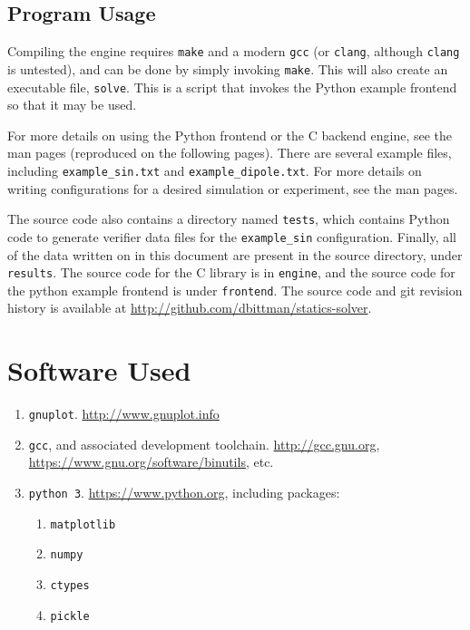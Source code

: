 \documentclass[12pt]{article}
\begin{document}
\clearpage
\begin{appendices}
\section{Program Usage}

	Compiling the engine requires \texttt{make} and a modern \texttt{gcc} (or \texttt{clang}, although \texttt{clang} is untested), and can
be done by simply invoking \texttt{make}. This will also create an executable file, \texttt{solve}. This
is a script that invokes the Python example frontend so that it may be used.

For more details on using the Python frontend or the C backend engine, see the man pages (reproduced on the
following pages). There are several example files, including \texttt{example\_sin.txt} and \texttt{example\_dipole.txt}.
For more details on writing configurations for a desired simulation or experiment, see the man pages.

The source code also contains a directory named \texttt{tests}, which contains Python code to generate verifier data
files for the \texttt{example\_sin} configuration. Finally, all of the data written on in this document are present
in the source directory, under \texttt{results}. The source code for the C library is in \texttt{engine}, and the
source code for the python example frontend is under \texttt{frontend}. The source code and git revision history
is available at \url{http://github.com/dbittman/statics-solver}.

	\begin{singlespacing}


\restoregeometry
	\end{singlespacing}
\clearpage






\end{appendices}

\clearpage

\section*{Software Used}

\begin{enumerate}
	\item \texttt{gnuplot}. \url{http://www.gnuplot.info}
	\item \texttt{gcc}, and associated development toolchain. \url{http://gcc.gnu.org}, \url{https://www.gnu.org/software/binutils}, etc.
	\item \texttt{python 3}. \url{https://www.python.org}, including packages:
		\begin{enumerate}
			\item \texttt{matplotlib}
			\item \texttt{numpy}
			\item \texttt{ctypes}
			\item \texttt{pickle}
		\end{enumerate}
\end{enumerate}

\clearpage

\onehalfspacing

\end{document}

